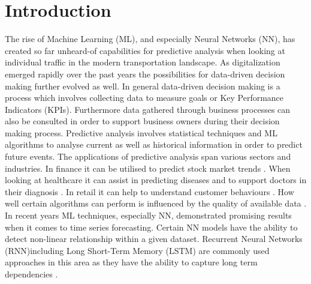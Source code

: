 %
%
% 
% 
% 

\chapter{Introduction}
\label{chap:introduction}
The rise of Machine Learning (ML), and especially Neural Networks (NN), has created so far unheard-of capabilities for predictive analysis when looking at individual traffic in the modern transportation landscape. As digitalization emerged rapidly over the past years the possibilities for data-driven decision making further evolved as well. In general data-driven decision making is a process which involves collecting data to measure goals or Key Performance Indicators (KPIs). Furthermore data gathered through business processes can also be consulted in order to support business owners during their decision making process.
\newline
\newline
Predictive analysis involves statistical techniques and ML algorithms to analyse current as well as historical information in order to predict future events. The applications of predictive analysis span various sectors and industries. In finance it can be utilised to predict stock market trends \cite{stock_market}. When looking at healthcare it can assist in predicting diseases and to support doctors in their diagnosis \cite{health_care}. In retail it can help to understand customer behaviours \cite{retail}. How well certain algorithms can perform is influenced by the quality of available data \cite{data_qual}. In recent years ML techniques, especially NN, demonstrated promising results when it comes to time series forecasting. Certain NN models have the ability to detect non-linear relationship within a given dataset. Recurrent Neural Networks (RNN)including Long Short-Term Memory (LSTM) are commonly used approaches in this area as they have the ability to capture long term dependencies \cite{intro_ml_1}.
\newline
\newline
